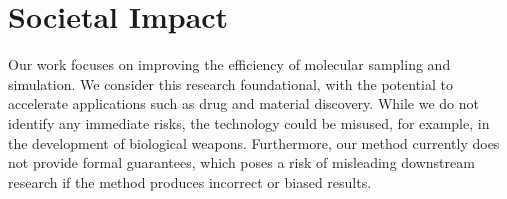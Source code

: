 \section{Societal Impact} \label{appx:societal-impact}
Our work focuses on improving the efficiency of molecular sampling and simulation. We consider this research foundational, with the potential to accelerate applications such as drug and material discovery. While we do not identify any immediate risks, the technology could be misused, for example, in the development of biological weapons. Furthermore, our method currently does not provide formal guarantees, which poses a risk of misleading downstream research if the method produces incorrect or biased results. 